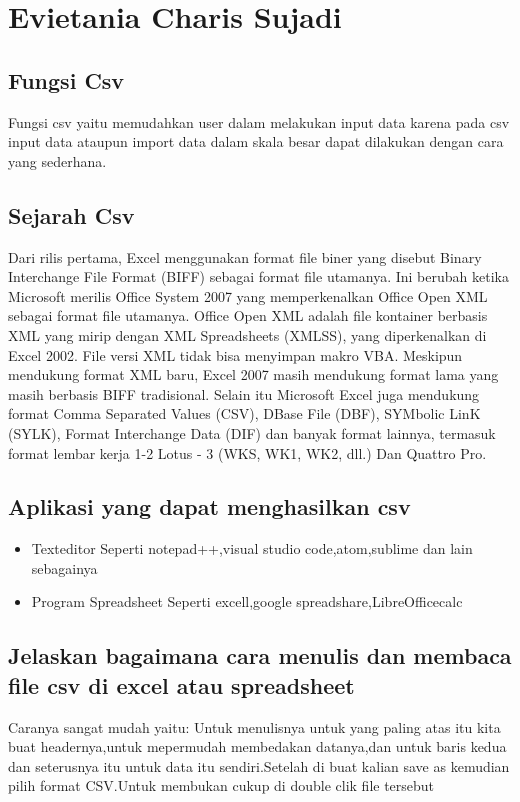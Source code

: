 \section{Evietania Charis Sujadi}
\subsection{Fungsi Csv}
Fungsi csv yaitu memudahkan user dalam melakukan input data karena pada csv input data ataupun import data dalam skala besar dapat dilakukan dengan cara yang sederhana.
\subsection{Sejarah Csv}
Dari rilis pertama, Excel menggunakan format file biner yang disebut Binary Interchange File Format (BIFF) sebagai format file utamanya. Ini berubah ketika Microsoft merilis Office System 2007 yang memperkenalkan Office Open XML sebagai format file utamanya. Office Open XML adalah file kontainer berbasis XML yang mirip dengan XML Spreadsheets (XMLSS), yang diperkenalkan di Excel 2002. File versi XML tidak bisa menyimpan makro VBA. Meskipun mendukung format XML baru, Excel 2007 masih mendukung format lama yang masih berbasis BIFF tradisional. Selain itu Microsoft Excel juga mendukung format Comma Separated Values (CSV), DBase File (DBF), SYMbolic LinK (SYLK), Format Interchange Data (DIF) dan banyak format lainnya, termasuk format lembar kerja 1-2 Lotus - 3 (WKS, WK1, WK2, dll.) Dan Quattro Pro.

\subsection{Aplikasi yang dapat menghasilkan csv}
\begin{itemize}
\item Texteditor
Seperti notepad++,visual studio code,atom,sublime dan lain sebagainya
\item Program Spreadsheet
  Seperti excell,google spreadshare,LibreOfficecalc
 \end{itemize}
\subsection{Jelaskan bagaimana cara menulis dan membaca file csv di excel atau spreadsheet}
Caranya sangat mudah yaitu:
 Untuk menulisnya untuk yang paling atas itu kita buat headernya,untuk mepermudah membedakan datanya,dan untuk baris kedua dan seterusnya itu untuk data itu sendiri.Setelah di buat kalian save as kemudian pilih format CSV.Untuk membukan cukup di double clik file tersebut
